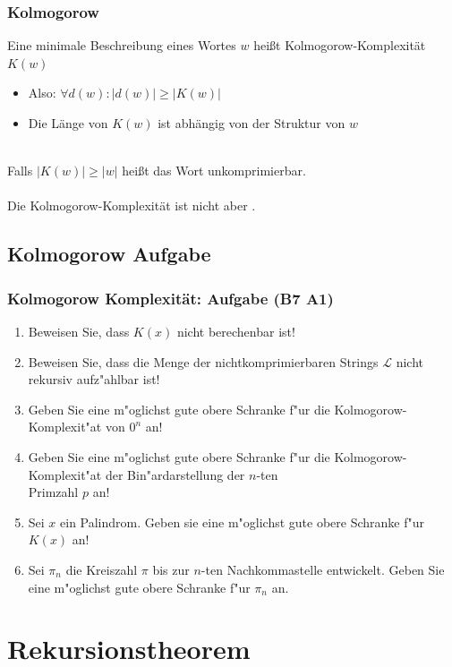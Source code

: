 \begin{frame}
	\frametitle{Kolmogorow}
	Eine minimale Beschreibung eines Wortes $w$ heißt Kolmogorow-Komplexität $K(w)$
	\begin{itemize}
		\item Also: $\forall d(w): |d(w)| \geq |K(w)|$
		\item Die Länge von $K(w)$ ist abhängig von der Struktur von $w$
	\end{itemize}~\\
	Falls $|K(w)| \geq |w|$ heißt das Wort unkomprimierbar.~\\~\\
	Die Kolmogorow-Komplexität ist nicht  aber \only<2>{rekursiv aufzählbar}.

\end{frame}

\subsection{Kolmogorow Aufgabe}
\begin{frame}
	\frametitle{Kolmogorow Komplexität: Aufgabe (B7 A1)}
	\begin{enumerate}
		\item Beweisen Sie, dass $K(x)$ nicht berechenbar ist!
		\item Beweisen Sie, dass die Menge der nichtkomprimierbaren Strings $\mathcal{L}$
		nicht rekursiv aufz"ahlbar ist!
		\item Geben Sie eine m"oglichst gute obere Schranke f"ur die Kolmogorow-Komplexit"at von $0^n$ an!
		\item Geben Sie eine m"oglichst gute obere Schranke f"ur die Kolmogorow-Komplexit"at der
		Bin"ardarstellung der $n$-ten\\ Primzahl $p$ an!
		\item Sei $x$ ein Palindrom. Geben sie eine m"oglichst gute obere Schranke f"ur $K(x)$ an!
		\item Sei $\pi_n$ die Kreiszahl $\pi$ bis zur $n$-ten Nachkommastelle entwickelt. Geben Sie eine m"oglichst gute obere Schranke f"ur $\pi_n$ an.
	\end{enumerate}
\end{frame}

\section{Rekursionstheorem}
